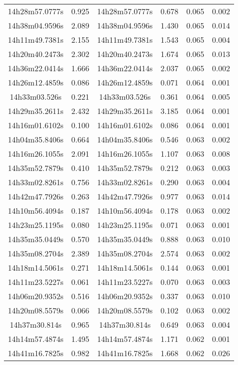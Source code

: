\begin{table}
\begin{tabular}{cccccc}
14h28m57.0777s & 0.925 & 14h28m57.0777s & 0.678 & 0.065 & 0.002 \\
14h38m04.9596s & 2.089 & 14h38m04.9596s & 1.430 & 0.065 & 0.014 \\
14h11m49.7381s & 2.155 & 14h11m49.7381s & 1.543 & 0.065 & 0.004 \\
14h20m40.2473s & 2.302 & 14h20m40.2473s & 1.674 & 0.065 & 0.013 \\
14h36m22.0414s & 1.666 & 14h36m22.0414s & 2.037 & 0.065 & 0.002 \\
14h26m12.4859s & 0.086 & 14h26m12.4859s & 0.071 & 0.064 & 0.001 \\
14h33m03.526s & 0.221 & 14h33m03.526s & 0.361 & 0.064 & 0.005 \\
14h29m35.2611s & 2.432 & 14h29m35.2611s & 3.185 & 0.064 & 0.001 \\
14h16m01.6102s & 0.100 & 14h16m01.6102s & 0.086 & 0.064 & 0.001 \\
14h04m35.8406s & 0.664 & 14h04m35.8406s & 0.546 & 0.063 & 0.002 \\
14h16m26.1055s & 2.091 & 14h16m26.1055s & 1.107 & 0.063 & 0.008 \\
14h35m52.7879s & 0.410 & 14h35m52.7879s & 0.212 & 0.063 & 0.003 \\
14h33m02.8261s & 0.756 & 14h33m02.8261s & 0.290 & 0.063 & 0.004 \\
14h42m47.7926s & 0.263 & 14h42m47.7926s & 0.977 & 0.063 & 0.014 \\
14h10m56.4094s & 0.187 & 14h10m56.4094s & 0.178 & 0.063 & 0.002 \\
14h23m25.1195s & 0.080 & 14h23m25.1195s & 0.071 & 0.063 & 0.001 \\
14h35m35.0449s & 0.570 & 14h35m35.0449s & 0.888 & 0.063 & 0.010 \\
14h35m08.2704s & 2.389 & 14h35m08.2704s & 2.574 & 0.063 & 0.002 \\
14h18m14.5061s & 0.271 & 14h18m14.5061s & 0.144 & 0.063 & 0.001 \\
14h11m23.5227s & 0.061 & 14h11m23.5227s & 0.070 & 0.063 & 0.003 \\
14h06m20.9352s & 0.516 & 14h06m20.9352s & 0.337 & 0.063 & 0.010 \\
14h20m08.5579s & 0.066 & 14h20m08.5579s & 0.102 & 0.063 & 0.002 \\
14h37m30.814s & 0.965 & 14h37m30.814s & 0.649 & 0.063 & 0.004 \\
14h14m57.4874s & 1.495 & 14h14m57.4874s & 1.171 & 0.062 & 0.001 \\
14h41m16.7825s & 0.982 & 14h41m16.7825s & 1.668 & 0.062 & 0.026 \\

\end{tabular}
\end{table}
